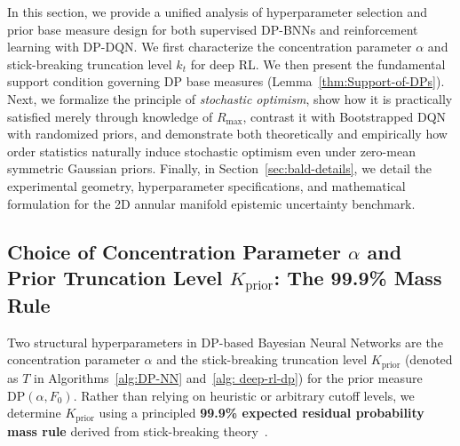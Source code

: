 \documentclass[10pt]{article}
\begin{document}
In this section, we provide a unified analysis of hyperparameter selection and prior base measure design for both supervised DP-BNNs and reinforcement learning with DP-DQN. We first characterize the concentration parameter $\alpha$ and stick-breaking truncation level $k_t$ for deep RL. We then present the fundamental support condition governing DP base measures (Lemma~\ref{thm:Support-of-DPs}). Next, we formalize the principle of \emph{stochastic optimism}, show how it is practically satisfied merely through knowledge of $R_{\max}$, contrast it with Bootstrapped DQN with randomized priors, and demonstrate both theoretically and empirically how order statistics naturally induce stochastic optimism even under zero-mean symmetric Gaussian priors. Finally, in Section~\ref{sec:bald-details}, we detail the experimental geometry, hyperparameter specifications, and mathematical formulation for the 2D annular manifold epistemic uncertainty benchmark.

\subsection{Choice of Concentration Parameter \texorpdfstring{$\alpha$}{alpha} and Prior Truncation Level \texorpdfstring{$K_{\text{prior}}$}{K\_prior}: The 99.9\% Mass Rule}
\label{sec:truncation-999-rule}

Two structural hyperparameters in DP-based Bayesian Neural Networks are the concentration parameter $\alpha$ and the stick-breaking truncation level $K_{\text{prior}}$ (denoted as $T$ in Algorithms~\ref{alg:DP-NN} and~\ref{alg: deep-rl-dp}) for the prior measure $\mathrm{DP}(\alpha, F_0)$. Rather than relying on heuristic or arbitrary cutoff levels, we determine $K_{\text{prior}}$ using a principled \textbf{99.9\% expected residual probability mass rule} derived from stick-breaking theory~\citep{ishwaran2001gibbs}.
\end{document}
